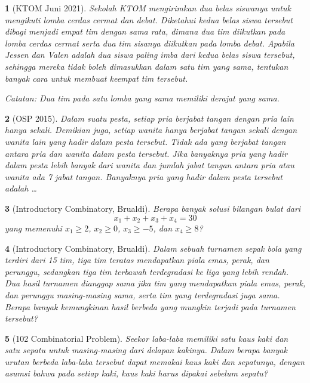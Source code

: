 \documentclass[11pt,a4paper,DIV=12]{scrartcl}
\theoremstyle{justnumber}
\newtheorem{problem}{}
\begin{document}
\begin{problem}[KTOM Juni 2021]
  Sekolah KTOM mengirimkan dua belas siswanya untuk mengikuti lomba cerdas cermat dan debat. Diketahui kedua belas siswa tersebut dibagi menjadi empat tim dengan sama rata, dimana dua tim diikutkan pada lomba cerdas cermat serta dua tim sisanya diikutkan pada lomba debat. Apabila Jessen dan Valen adalah dua siswa paling imba dari kedua belas siswa tersebut, sehingga mereka tidak boleh dimasukkan dalam satu tim yang sama, tentukan banyak cara untuk membuat keempat tim tersebut.

  \noindent\textit{Catatan: Dua tim pada satu lomba yang sama memiliki derajat yang sama.}
\end{problem}


\begin{problem}[OSP 2015]
  Dalam suatu pesta, setiap pria berjabat tangan dengan pria lain hanya sekali. Demikian juga, setiap wanita hanya berjabat tangan sekali dengan wanita lain yang hadir dalam pesta tersebut. Tidak ada yang berjabat tangan antara pria dan wanita dalam pesta tersebut. Jika banyaknya pria yang hadir dalam pesta lebih banyak dari wanita dan jumlah jabat tangan antara pria atau wanita ada 7 jabat tangan. Banyaknya pria yang hadir dalam pesta tersebut adalah \ldots
\end{problem}


\begin{problem}[Introductory Combinatory, Brualdi]
  Berapa banyak solusi bilangan bulat dari
  \[
    x_1 + x_2 + x_3 + x_4 = 30
  \]
  yang memenuhi $x_1 \geq 2$, $x_2 \geq 0$, $x_3 \geq -5$, dan $x_4 \geq 8$?
\end{problem}

\begin{problem}[Introductory Combinatory, Brualdi]
  Dalam sebuah turnamen sepak bola yang terdiri dari 15 tim, tiga tim teratas mendapatkan piala emas, perak, dan perunggu, sedangkan tiga tim terbawah terdegradasi ke liga yang lebih rendah. Dua hasil turnamen dianggap sama jika tim yang mendapatkan piala emas, perak, dan perunggu masing-masing sama, serta tim yang terdegradasi juga sama. Berapa banyak kemungkinan hasil berbeda yang mungkin terjadi pada turnamen tersebut?
\end{problem}
\begin{problem}[102 Combinatorial  Problem]
  Seekor laba-laba memiliki satu kaus kaki dan satu sepatu untuk masing-masing dari delapan kakinya. Dalam berapa banyak urutan berbeda laba-laba tersebut dapat memakai kaus kaki dan sepatunya, dengan asumsi bahwa pada setiap kaki, kaus kaki harus dipakai sebelum sepatu?
\end{problem}
\end{document}

